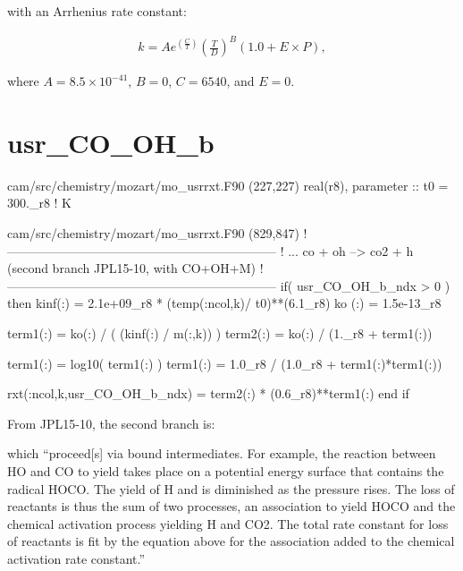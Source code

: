 \documentclass[titlepage]{article}
\begin{document}

\vspace{20px}
\noindent with an Arrhenius rate constant:

\begin{equation}
\begin{split}
k = Ae^{(\frac{C}{T})}(\frac{T}{D})^B(1.0+E \times P),
\end{split}
\end{equation}

\noindent where $A = 8.5 \times 10^{-41}$, $B = 0$, $C = 6540$, and $E = 0$.



\section{usr\_CO\_OH\_b}

\begin{blockcode}[commandchars=\\\{\}]
\color{gray}cam/src/chemistry/mozart/mo_usrrxt.F90 (227,227)
  real(r8), parameter :: t0     = 300._r8                ! K
\end{blockcode}
\begin{blockcode}[commandchars=\\\{\}]
\color{gray}cam/src/chemistry/mozart/mo_usrrxt.F90 (829,847)
!-----------------------------------------------------------------
!   ... co + oh --> co2 + h (second branch JPL15-10, with CO+OH+M)
!-----------------------------------------------------------------
       if( usr_CO_OH_b_ndx > 0 ) then
         kinf(:)  = 2.1e+09_r8 * (temp(:ncol,k)/ t0)**(6.1_r8)
         ko  (:)  = 1.5e-13_r8

         term1(:) = ko(:) / ( (kinf(:) / m(:,k)) )
         term2(:) = ko(:) / (1._r8 + term1(:))

         term1(:) = log10( term1(:) )
         term1(:) = 1.0_r8 / (1.0_r8 + term1(:)*term1(:))

         rxt(:ncol,k,usr_CO_OH_b_ndx) = term2(:) * (0.6_r8)**term1(:)
       end if
\end{blockcode}

From JPL15-10, the second branch is:
\vspace{20px}


\vspace{20px}
\noindent which ``proceed[s] via bound intermediates. For example, the reaction between HO and CO to yield  takes place on a potential energy surface that contains the radical HOCO. The yield of H and  is diminished as the pressure rises. The loss of reactants is thus the sum of two processes, an association to yield HOCO and the chemical activation process yielding H and CO2. The total rate constant for loss of reactants is fit by the equation above for the association added to the chemical activation rate constant.''
\end{document}
